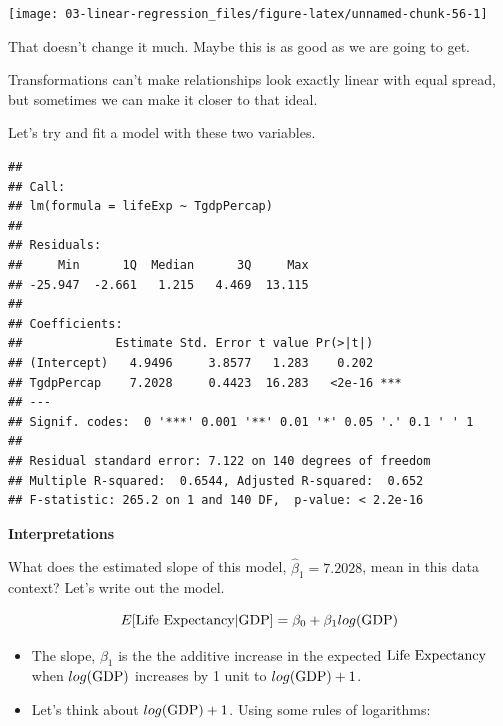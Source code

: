 \documentclass[
]{book}
\newenvironment{Shaded}{\begin{snugshade}}{\end{snugshade}}
\newcommand{\DataTypeTok}[1]{\textcolor[rgb]{0.13,0.29,0.53}{#1}}
\newcommand{\DecValTok}[1]{\textcolor[rgb]{0.00,0.00,0.81}{#1}}
\newcommand{\KeywordTok}[1]{\textcolor[rgb]{0.13,0.29,0.53}{\textbf{#1}}}
\newcommand{\NormalTok}[1]{#1}
\newcommand{\OperatorTok}[1]{\textcolor[rgb]{0.81,0.36,0.00}{\textbf{#1}}}
\newcommand{\StringTok}[1]{\textcolor[rgb]{0.31,0.60,0.02}{#1}}
\begin{document}
\begin{center}\texttt{[image: 03-linear-regression\_files/figure-latex/unnamed-chunk-56-1]} \end{center}

That doesn't change it much. Maybe this is as good as we are going to get.

Transformations can't make relationships look exactly linear with equal spread, but sometimes we can make it closer to that ideal.

Let's try and fit a model with these two variables.

\begin{Shaded}
\end{Shaded}

\begin{verbatim}
## 
## Call:
## lm(formula = lifeExp ~ TgdpPercap)
## 
## Residuals:
##     Min      1Q  Median      3Q     Max 
## -25.947  -2.661   1.215   4.469  13.115 
## 
## Coefficients:
##             Estimate Std. Error t value Pr(>|t|)    
## (Intercept)   4.9496     3.8577   1.283    0.202    
## TgdpPercap    7.2028     0.4423  16.283   <2e-16 ***
## ---
## Signif. codes:  0 '***' 0.001 '**' 0.01 '*' 0.05 '.' 0.1 ' ' 1
## 
## Residual standard error: 7.122 on 140 degrees of freedom
## Multiple R-squared:  0.6544,	Adjusted R-squared:  0.652 
## F-statistic: 265.2 on 1 and 140 DF,  p-value: < 2.2e-16
\end{verbatim}

\textbf{Interpretations}

What does the estimated slope of this model, \(\hat{\beta}_1 = 7.2028\), mean in this data context? Let's write out the model.

\[E[\hbox{Life Expectancy} | \hbox{GDP} ] = \beta_0 + \beta_1 log(\hbox{GDP})\]

\begin{itemize}
\item
  The slope, \(\beta_1\) is the the additive increase in the expected \(\hbox{Life Expectancy}\) when \(log(\hbox{GDP})\) increases by 1 unit to \(log(\hbox{GDP}) + 1\).
\item
  Let's think about \(log(\hbox{GDP}) + 1\). Using some rules of logarithms:
\end{itemize}
\end{document}
